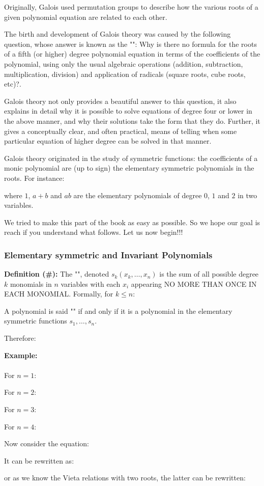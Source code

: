 	Originally, Galois used permutation groups to describe how the various roots of a given polynomial equation are related to each other. 
	
	The birth and development of Galois theory was caused by the following question, whose answer is known as the "": Why is there no formula for the roots of a fifth (or higher) degree polynomial equation in terms of the coefficients of the polynomial, using only the usual algebraic operations (addition, subtraction, multiplication, division) and application of radicals (square roots, cube roots, etc)?.
	
	Galois theory not only provides a beautiful answer to this question, it also explains in detail why it is possible to solve equations of degree four or lower in the above manner, and why their solutions take the form that they do. Further, it gives a conceptually clear, and often practical, means of telling when some particular equation of higher degree can be solved in that manner.
	
	Galois theory originated in the study of symmetric functions:  the coefficients of a monic polynomial are (up to sign) the elementary symmetric polynomials in the roots. For instance:
	
 	where $1$, $a + b$ and $ab$ are the elementary polynomials of degree $0$, $1$ and $2$ in two variables.
 	
 	We tried to make this part of the book as easy as possible. So we hope our goal is reach if you understand what follows. Let us now begin!!!
 	
 	\subsubsection{Elementary symmetric and Invariant Polynomials}
 	\textbf{Definition (\#\mydef):} The "", denoted $s_k(x_k,\ldots , x_n)$ is the sum of all possible degree $k$ monomials in $n$ variables with each $x_i$ appearing NO MORE THAN ONCE IN EACH MONOMIAL. Formally, for $k\leq n$:
	
	A polynomial is said "" if and only if it is a polynomial in the elementary symmetric functions $s_1,\ldots, s_n$.

	Therefore:
	
	\begin{tcolorbox}[colframe=black,colback=white,sharp corners]
	\textbf{{\Large {}}Example:}\\\\
	For $n = 1$:
	
	For $n = 2$:
	
	For $n = 3$:
	
	For $n = 4$:
	
	Now consider the equation:
	
	It can be rewritten as:
	
	or as we know the Vieta relations with two roots, the latter can be rewritten:
	
		\end{tcolorbox}
	
